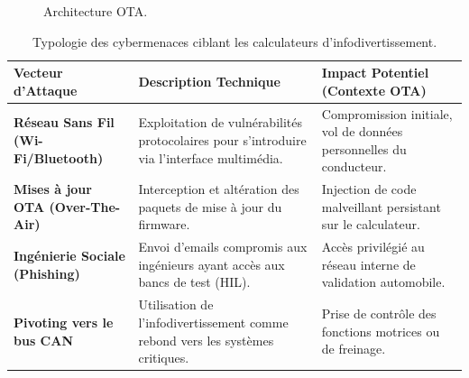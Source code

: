 \documentclass[a4paper, 12pt]{report}
\begin{document}
\begin{figure}[H]
{
    }
    \caption[Architecture OTA]{Architecture OTA.}
    \label{fig:architecture_ota}
\end{figure}

\begin{table}[htbp]
\centering
\caption[Typologie des cybermenaces ciblant les calculateurs d'infodivertissement]{Typologie des cybermenaces ciblant les calculateurs d'infodivertissement.}
\label{tab:menaces_infotainment}
\vspace{0.2cm}
\begin{tabular}{|>{\raggedright\arraybackslash}p{3cm}|>{\raggedright\arraybackslash}p{5cm}|>{\raggedright\arraybackslash}p{5cm}|}
\hline
\textbf{Vecteur d'Attaque} & \textbf{Description Technique} & \textbf{Impact Potentiel (Contexte OTA)} \\ \hline
\textbf{Réseau Sans Fil (Wi-Fi/Bluetooth)} & Exploitation de vulnérabilités protocolaires pour s'introduire via l'interface multimédia. & Compromission initiale, vol de données personnelles du conducteur. \\ \hline
\textbf{Mises à jour OTA (Over-The-Air)} & Interception et altération des paquets de mise à jour du firmware. & Injection de code malveillant persistant sur le calculateur. \\ \hline
\textbf{Ingénierie Sociale (Phishing)} & Envoi d'emails compromis aux ingénieurs ayant accès aux bancs de test (HIL). & Accès privilégié au réseau interne de validation automobile. \\ \hline
\textbf{Pivoting vers le bus CAN} & Utilisation de l'infodivertissement comme rebond vers les systèmes critiques. & Prise de contrôle des fonctions motrices ou de freinage. \\ \hline
\end{tabular}
\end{table}
\end{document}
